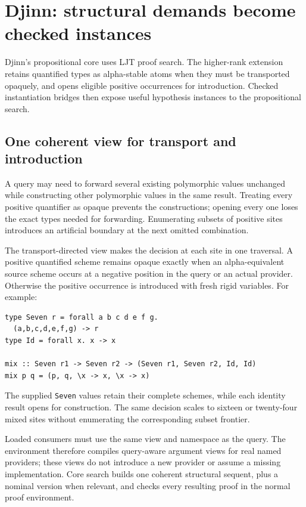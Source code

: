 \documentclass[11pt]{article}
\newcommand{\code}[1]{\texttt{#1}}
\begin{document}
\section{Djinn: structural demands become checked instances}

Djinn's propositional core uses LJT proof search. The higher-rank extension
retains quantified types as alpha-stable atoms when they must be transported
opaquely, and opens eligible positive occurrences for introduction. Checked
instantiation bridges then expose useful hypothesis instances to the
propositional search.

\subsection{One coherent view for transport and introduction}

A query may need to forward several existing polymorphic values unchanged
while constructing other polymorphic values in the same result. Treating
every positive quantifier as opaque prevents the constructions; opening every
one loses the exact types needed for forwarding. Enumerating subsets of
positive sites introduces an artificial boundary at the next omitted
combination.

The transport-directed view makes the decision at each site in one traversal.
A positive quantified scheme remains opaque exactly when an alpha-equivalent
source scheme occurs at a negative position in the query or an actual
provider. Otherwise the positive occurrence is introduced with fresh rigid
variables. For example:
\begin{lstlisting}
type Seven r = forall a b c d e f g.
  (a,b,c,d,e,f,g) -> r
type Id = forall x. x -> x

mix :: Seven r1 -> Seven r2 -> (Seven r1, Seven r2, Id, Id)
mix p q = (p, q, \x -> x, \x -> x)
\end{lstlisting}
The supplied \code{Seven} values retain their complete schemes, while each
identity result opens for construction. The same decision scales to sixteen
or twenty-four mixed sites without enumerating the corresponding subset
frontier.

Loaded consumers must use the same view and namespace as the query. The
environment therefore compiles query-aware argument views for real named
providers; these views do not introduce a new provider or assume a missing
implementation. Core search builds one coherent structural sequent, plus a
nominal version when relevant, and checks every resulting proof in the normal
proof environment.
\end{document}
